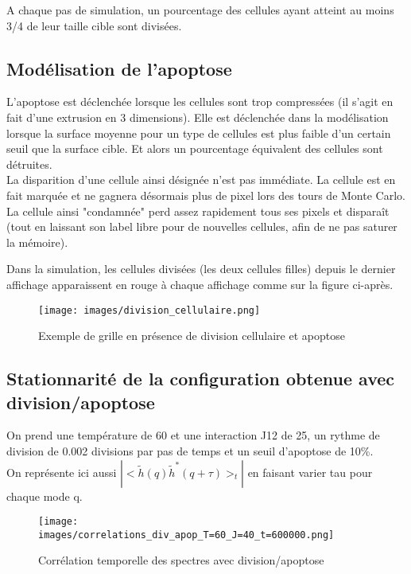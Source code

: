 \documentclass[11pt,a4paper]{article}
\begin{document}
A chaque pas de simulation, un pourcentage des cellules ayant atteint au moins 3/4 de leur taille cible sont divisées.  \\


\subsection{Modélisation de l'apoptose}

L'apoptose est déclenchée lorsque les cellules sont trop compressées (il s'agit en fait d'une extrusion en 3 dimensions). Elle est déclenchée dans la modélisation lorsque la surface moyenne pour un type de cellules est plus faible d'un certain seuil que la surface cible. Et alors un pourcentage équivalent des cellules sont détruites.\\
La disparition d'une cellule ainsi désignée n'est pas immédiate. La cellule est en fait marquée et ne gagnera désormais plus de pixel lors des tours de Monte Carlo. La cellule ainsi "condamnée" perd assez rapidement tous ses pixels et disparaît (tout en laissant son label libre pour de nouvelles cellules, afin de ne pas saturer la mémoire).

Dans la simulation, les cellules divisées (les deux cellules filles) depuis le dernier affichage apparaissent en rouge à chaque affichage comme sur la figure ci-après.

\begin{figure}[H]
\begin{center}
\texttt{[image: images/division\_cellulaire.png]}
\caption{Exemple de grille en présence de division cellulaire et apoptose}
\label{mafigure}
\end{center}
\end{figure}

\subsection{Stationnarité de la configuration obtenue avec division/apoptose}

On prend une température de 60 et une interaction J12 de 25, un rythme de division de 0.002 divisions par pas de temps et un seuil d'apoptose de 10\%.\\

On représente ici aussi $|<\tilde{h}(q) {\tilde{h}}^*(q+\tau)>_t|$ en faisant varier tau pour chaque mode q.\\

\begin{figure}[H]
\begin{center}
\texttt{[image: images/correlations\_div\_apop\_T=60\_J=40\_t=600000.png]}
\caption{Corrélation temporelle des spectres avec division/apoptose}
\label{mafigure}
\end{center}
\end{figure}
\end{document}

